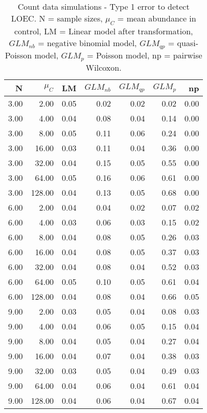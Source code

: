 \begin{table}[H]
\centering
\caption{Count data simulations - Type 1 error to detect LOEC. N = sample sizes, 
             $\mu_C$ = mean abundance in control, LM = Linear model after transformation, 
             $GLM_{nb}$ = negative binomial model, $GLM_{qp}$ = quasi-Poisson model, 
            $GLM_{p}$ = Poisson model, np = pairwise Wilcoxon.} 
\label{tab:t1_loec_c}
{\footnotesize
\begin{tabular}{rrrrrrr}
  \hline
N & $\mu_C$ & LM & $GLM_{nb}$ & $GLM_{qp}$ & $GLM_{p}$ & np \\ 
  \hline
3.00 & 2.00 & 0.05 & 0.02 & 0.02 & 0.02 & 0.00 \\ 
  3.00 & 4.00 & 0.04 & 0.08 & 0.04 & 0.14 & 0.00 \\ 
  3.00 & 8.00 & 0.05 & 0.11 & 0.06 & 0.24 & 0.00 \\ 
  3.00 & 16.00 & 0.03 & 0.11 & 0.04 & 0.36 & 0.00 \\ 
  3.00 & 32.00 & 0.04 & 0.15 & 0.05 & 0.55 & 0.00 \\ 
  3.00 & 64.00 & 0.05 & 0.16 & 0.06 & 0.61 & 0.00 \\ 
  3.00 & 128.00 & 0.04 & 0.13 & 0.05 & 0.68 & 0.00 \\ 
  6.00 & 2.00 & 0.04 & 0.04 & 0.02 & 0.07 & 0.02 \\ 
  6.00 & 4.00 & 0.03 & 0.06 & 0.03 & 0.15 & 0.02 \\ 
  6.00 & 8.00 & 0.04 & 0.08 & 0.05 & 0.26 & 0.03 \\ 
  6.00 & 16.00 & 0.04 & 0.08 & 0.05 & 0.37 & 0.03 \\ 
  6.00 & 32.00 & 0.04 & 0.08 & 0.04 & 0.52 & 0.03 \\ 
  6.00 & 64.00 & 0.05 & 0.10 & 0.05 & 0.61 & 0.04 \\ 
  6.00 & 128.00 & 0.04 & 0.08 & 0.04 & 0.66 & 0.05 \\ 
  9.00 & 2.00 & 0.03 & 0.05 & 0.04 & 0.08 & 0.03 \\ 
  9.00 & 4.00 & 0.04 & 0.06 & 0.05 & 0.15 & 0.04 \\ 
  9.00 & 8.00 & 0.04 & 0.05 & 0.04 & 0.27 & 0.04 \\ 
  9.00 & 16.00 & 0.04 & 0.07 & 0.04 & 0.38 & 0.03 \\ 
  9.00 & 32.00 & 0.03 & 0.05 & 0.04 & 0.49 & 0.03 \\ 
  9.00 & 64.00 & 0.04 & 0.06 & 0.04 & 0.61 & 0.04 \\ 
  9.00 & 128.00 & 0.04 & 0.06 & 0.04 & 0.67 & 0.04 \\ 
   \hline
\end{tabular}
}
\end{table}

